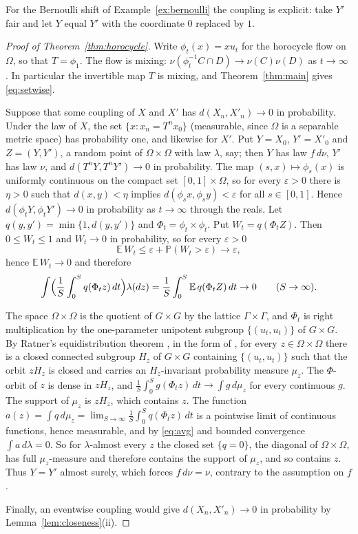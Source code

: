 \documentclass[11pt]{amsart}
\theoremstyle{definition}
\theoremstyle{remark}
\newcommand{\E}{\mathbb E}
\newcommand{\Prob}{\mathbb P}
\begin{document}
For the Bernoulli shift of Example~\ref{ex:bernoulli} the coupling is explicit: take $Y'$ fair and let $Y$ equal $Y'$ with the coordinate $0$
replaced by $1$.

\begin{proof}[Proof of Theorem~\ref{thm:horocycle}]
Write $\phi_t(x)=xu_t$ for the horocycle flow on $\Omega$, so that $T=\phi_1$. The flow is mixing:
$\nu(\phi_t^{-1}C\cap D)\to\nu(C)\nu(D)$ as $t\to\infty$ \cite[Remark~3.2.8]{Mor05}. In particular the invertible map
$T$ is mixing, and Theorem~\ref{thm:main} gives \eqref{eq:setwise}.

Suppose that some coupling of $X$ and $X'$ has $d(X_n,X'_n)\to0$ in probability. Under the law of $X$, the set
$\{x:x_n=T^nx_0\}$ (measurable, since $\Omega$ is a separable metric space) has probability one, and likewise for $X'$.
Put $Y=X_0$, $Y'=X'_0$ and $Z=(Y,Y')$, a random point of $\Omega\times\Omega$ with law $\lambda$, say; then $Y$ has law
$f\,d\nu$, $Y'$ has law $\nu$, and $d(T^nY,T^nY')\to0$ in probability. The map $(s,x)\mapsto\phi_s(x)$ is uniformly
continuous on the compact set $[0,1]\times\Omega$, so for every $\varepsilon>0$ there is $\eta>0$ such that
$d(x,y)<\eta$ implies $d(\phi_sx,\phi_sy)<\varepsilon$ for all $s\in[0,1]$. Hence $d(\phi_tY,\phi_tY')\to0$ in
probability as $t\to\infty$ through the reals. Let $q(y,y')=\min\{1,d(y,y')\}$ and
$\Phi_t=\phi_t\times\phi_t$. Put $W_t=q(\Phi_tZ)$. Then $0\le W_t\le1$ and $W_t\to0$ in probability, so for every $\varepsilon>0$
\[
\E\,W_t\le\varepsilon+\Prob(W_t>\varepsilon)\to\varepsilon ,
\]
hence $\E\,W_t\to0$ and therefore
\begin{equation}\label{eq:avg}
\int\Bigl(\frac1S\int_0^Sq(\Phi_tz)\,dt\Bigr)\lambda(dz)=\frac1S\int_0^S\E\,q(\Phi_tZ)\,dt\to0\qquad(S\to\infty).
\end{equation}

The space $\Omega\times\Omega$ is the quotient of $G\times G$ by the lattice $\Gamma\times\Gamma$, and $\Phi_t$ is right
multiplication by the one-parameter unipotent subgroup $\{(u_t,u_t)\}$ of $G\times G$. By Ratner's equidistribution
theorem \cite{Rat91}, in the form of \cite[Theorem~1.3.4 and Remark~1.3.5]{Mor05}, for every $z\in\Omega\times\Omega$
there is a closed connected subgroup $H_z$ of $G\times G$ containing $\{(u_t,u_t)\}$ such that the orbit $zH_z$ is
closed and carries an $H_z$-invariant probability measure $\mu_z$. The $\Phi$-orbit of $z$ is dense in $zH_z$, and
$\frac1S\int_0^Sg(\Phi_tz)\,dt\to\int g\,d\mu_z$ for every continuous $g$. The support of $\mu_z$ is $zH_z$, which
contains $z$. The function
$a(z)=\int q\,d\mu_z=\lim_{S\to\infty}\frac1S\int_0^Sq(\Phi_tz)\,dt$ is a pointwise limit of continuous functions,
hence measurable, and by \eqref{eq:avg} and bounded convergence $\int a\,d\lambda=0$. So for $\lambda$-almost every $z$
the closed set $\{q=0\}$, the diagonal of $\Omega\times\Omega$, has full $\mu_z$-measure and therefore contains the
support of $\mu_z$, and so contains $z$. Thus $Y=Y'$ almost surely, which forces $f\,d\nu=\nu$, contrary to the
assumption on $f$.

Finally, an eventwise coupling would give $d(X_n,X'_n)\to0$ in probability by Lemma~\ref{lem:closeness}(ii).
\end{proof}
\end{document}
